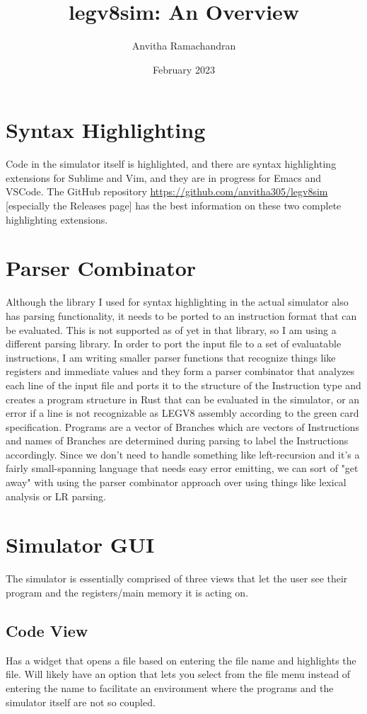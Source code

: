 \documentclass{article}
\title{legv8sim: An Overview}
\author{Anvitha Ramachandran}
\date{February 2023}
\begin{document}
\maketitle
\tableofcontents

\section{Syntax Highlighting}
Code in the simulator itself is highlighted, and there are syntax highlighting extensions for Sublime and Vim, and they are in progress for Emacs and VSCode.
The GitHub repository \url{https://github.com/anvitha305/legv8sim} [especially the Releases page] has the best information on these two complete highlighting extensions. 
\section{Parser Combinator}
Although the library I used for syntax highlighting in the actual simulator also has parsing functionality, it needs to be ported to an instruction format that can be evaluated. This is not supported as of yet in that library, so I am using a different parsing library. In order to port the input file to a set of evaluatable instructions, I am writing smaller parser functions that recognize things like registers and immediate values and they form a parser combinator that analyzes each line of the input file and ports it to the structure of the Instruction type and creates a program structure in Rust that can be evaluated in the simulator, or an error if a line is not recognizable as LEGV8 assembly according to the green card specification. Programs are a vector of Branches which are vectors of Instructions and names of Branches are determined during parsing to label the Instructions accordingly. Since we don't need to handle something like left-recursion and it's a fairly small-spanning language that needs easy error emitting, we can sort of "get away" with using the parser combinator approach over using things like lexical analysis or LR parsing.

\section{Simulator GUI}
The simulator is essentially comprised of three views that let the user see their program and the registers/main memory it is acting on.

\subsection{Code View}
Has a widget that opens a file based on entering the file name and highlights the file. Will likely have an option that lets you select from the file menu instead of entering the name to facilitate an environment where the programs and the simulator itself are not so coupled.
\end{document}
